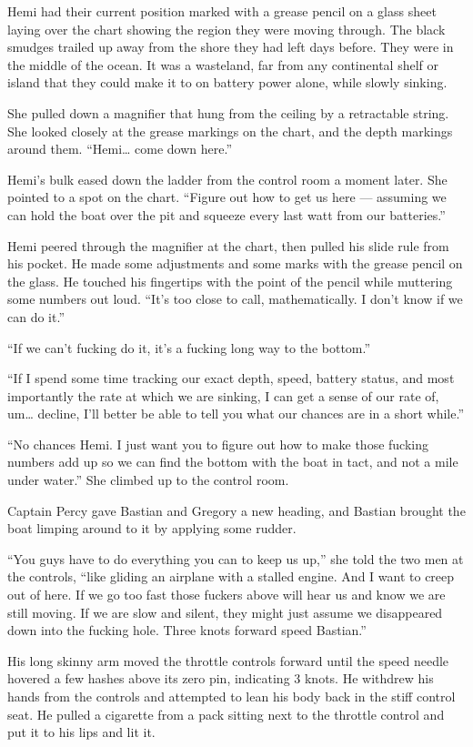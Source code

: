 \documentclass[]{article}
\begin{document}
\begin{multicols}{2}
Hemi had their current position marked with a grease pencil on a glass
sheet laying over the chart showing the region they were moving through.
The black smudges trailed up away from the shore they had left days
before. They were in the middle of the ocean. It was a wasteland, far
from any continental shelf or island that they could make it to on
battery power alone, while slowly sinking.

She pulled down a magnifier that hung from the ceiling by a retractable
string. She looked closely at the grease markings on the chart, and the
depth markings around them. ``Hemi\ldots{} come down here.''

Hemi's bulk eased down the ladder from the control room a moment later.
She pointed to a spot on the chart. ``Figure out how to get us here ---
assuming we can hold the boat over the pit and squeeze every last watt
from our batteries.''

Hemi peered through the magnifier at the chart, then pulled his slide
rule from his pocket. He made some adjustments and some marks with the
grease pencil on the glass. He touched his fingertips with the point of
the pencil while muttering some numbers out loud. ``It's too close to
call, mathematically. I don't know if we can do it.''

``If we can't fucking do it, it's a fucking long way to the bottom.''

``If I spend some time tracking our exact depth, speed, battery status,
and most importantly the rate at which we are sinking, I can get a sense
of our rate of, um\ldots{} decline, I'll better be able to tell you what
our chances are in a short while.''

``No chances Hemi. I just want you to figure out how to make those
fucking numbers add up so we can find the bottom with the boat in tact,
and not a mile under water.'' She climbed up to the control room.

Captain Percy gave Bastian and Gregory a new heading, and Bastian
brought the boat limping around to it by applying some rudder.

``You guys have to do everything you can to keep us up,'' she told the
two men at the controls, ``like gliding an airplane with a stalled
engine. And I want to creep out of here. If we go too fast those fuckers
above will hear us and know we are still moving. If we are slow and
silent, they might just assume we disappeared down into the fucking
hole. Three knots forward speed Bastian.''

His long skinny arm moved the throttle controls forward until the speed
needle hovered a few hashes above its zero pin, indicating 3 knots. He
withdrew his hands from the controls and attempted to lean his body back
in the stiff control seat. He pulled a cigarette from a pack sitting
next to the throttle control and put it to his lips and lit it.


\end{multicols}
\end{document}
